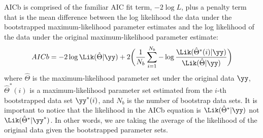 AICb is comprised of the familiar AIC fit term, $-2 \log L$, plus a penalty term that is the mean difference between the log likelihood the data under the bootstrapped maximum-likelihood parameter estimates and the log likelihood of the data under the original maximum-likelihood parameter estimate:
\begin{equation}
	AICb = -2 \log \Lik(\hat{\Theta} | \yy) + 2 \bigg( \frac{1}{N_b}\sum_{i=1}^{N_b} -\log \frac{\Lik(\hat{\Theta}^*(i) | \yy)}{\Lik(\hat{\Theta} | \yy)}\bigg)
\label{eq:AICb}
\end{equation}
where $\hat{\Theta}$ is the maximum-likelihood parameter set under the original data $\yy$, $\hat{\Theta}^*(i)$ is a maximum-likelihood parameter set estimated from the $i$-th bootstrapped data set $\yy^*(i)$, and $N_b$ is the number of bootstrap data sets.  It is important to notice that the likelihood in the AICb equation is $\Lik(\hat{\Theta}^* | \yy)$ not $\Lik(\hat{\Theta}^* | \yy^*)$.  In other words, we are taking the average of the likelihood of the original data given the bootstrapped parameter sets. 
